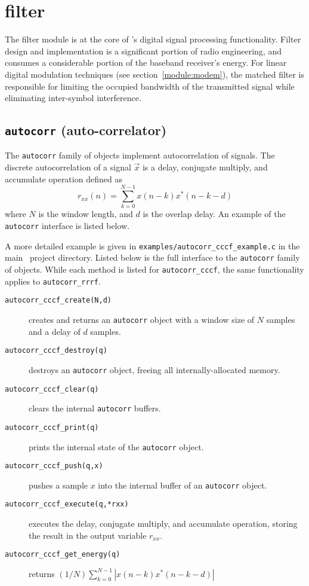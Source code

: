 % 
%

\newpage
\section{filter}
\label{module:filter}
The filter module is at the core of \liquid's digital signal processing
functionality.
Filter design and implementation is a significant portion of radio
engineering, and consumes a considerable portion of the baseband receiver's
energy.
For linear digital modulation techniques (see section~\ref{module:modem}),
the matched filter is responsible for limiting the occupied bandwidth of the
transmitted signal while eliminating inter-symbol interference.


% 
%
\subsection{{\tt autocorr} (auto-correlator)}
\label{module:filter:autocorr}
The {\tt autocorr} family of objects implement autocorrelation of
signals.
The discrete autocorrelation of a signal $\vec{x}$
is a delay, conjugate multiply, and accumulate operation defined as
%
\begin{equation}
\label{eqn:filter:autocorr}
    r_{xx}(n) = \sum_{k=0}^{N-1} {x(n-k)x^*(n-k-d)}
\end{equation}
%
where $N$ is the window length, and $d$ is the overlap delay.
An example of the {\tt autocorr} interface is listed below.
%

%
A more detailed example is given in
{\tt examples/autocorr\_cccf\_example.c}
in the main \liquid\ project directory.
%
Listed below is the full interface to the {\tt autocorr} family of
objects.
While each method is listed for {\tt autocorr\_cccf}, the same
functionality applies to {\tt autocorr\_rrrf}.
%
\begin{description}
\item[{\tt autocorr\_cccf\_create(N,d)}]
    creates and returns an {\tt autocorr} object with a window size of
    $N$ samples and a delay of $d$ samples.
\item[{\tt autocorr\_cccf\_destroy(q)}]
    destroys an {\tt autocorr} object, freeing all internally-allocated
    memory.
\item[{\tt autocorr\_cccf\_clear(q)}]
    clears the internal {\tt autocorr} buffers.
\item[{\tt autocorr\_cccf\_print(q)}]
    prints the internal state of the {\tt autocorr} object.
\item[{\tt autocorr\_cccf\_push(q,x)}]
    pushes a sample $x$ into the internal buffer of an {\tt autocorr}
    object.
\item[{\tt autocorr\_cccf\_execute(q,*rxx)}]
    executes the delay, conjugate multiply, and accumulate operation,
    storing the result in the output variable $r_{xx}$.
\item[{\tt autocorr\_cccf\_get\_energy(q)}]
    returns $(1/N)\sum_{k=0}^{N-1}{|x(n-k)x^*(n-k-d)|}$
\end{description}



